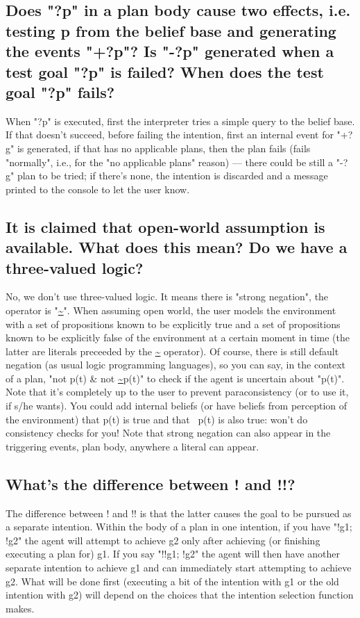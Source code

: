 \documentclass{article}
\newcommand{\jason}[0]{\htlink{\textit{Jason}}{http://jason.sf.net}\xspace}
\begin{document}
\begin{description}
\subsection{Does "?p" in a plan body cause two effects, i.e. testing p
from the belief base and generating the events "+?p"? Is "-?p"
  generated when a test goal "?p" is failed? When does the test goal
  "?p" fails?}

When "?p" is executed, first the interpreter tries a simple query to the
belief base. If that doesn't succeed, before failing the intention, first an
internal event for "+?g" is generated, if that has no applicable plans, then
the plan fails (fails "normally", i.e., for the "no applicable plans"
reason) --- there could be still a "-?g" plan to be tried; if there's none,
the intention is discarded and a message printed to the console to let the
user know.

\subsection{It is claimed that open-world assumption is available. What
does this mean? Do we have a three-valued logic?}

No, we don't use three-valued logic. It means there is "strong negation", the
operator is "\url{~}". When assuming open world, the user models the
environment with a set of propositions known to be explicitly true and a set
of propositions known to be explicitly false of the environment at a certain
moment in time (the latter are literals preceeded by the \url{~} operator).
Of course, there is still default negation (as usual logic programming
languages), so you can say, in the context of a plan, "not p(t) \& not
\url{~}p(t)" to check if the agent is uncertain about "p(t)". Note that it's
completely up to the user to prevent paraconsistency (or to use it, if s/he
wants). You could add internal beliefs (or have beliefs from perception of the
environment) that p(t) is true and that ~p(t) is also true: \jason won't do
consistency checks for you! Note that strong negation can also appear in the
triggering events, plan body, anywhere a literal can appear.


\subsection{What's the difference between ! and !!?}

The difference between ! and !! is that the latter causes the goal to
be pursued as a separate intention. Within the body of a plan in one
intention, if you have "!g1; !g2" the agent will attempt to achieve g2
only after achieving (or finishing executing a plan for) g1.  If you
say "!!g1; !g2" the agent will then have another separate intention to
achieve g1 and can immediately start attempting to achieve g2. What
will be done first (executing a bit of the intention with g1 or the
old intention with g2) will depend on the choices that the intention
selection function makes. 


\end{description}
\end{document}
